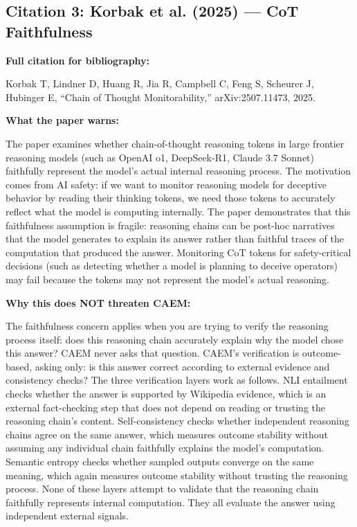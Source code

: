 \documentclass[11pt,a4paper]{article}
\newcommand{\citationbox}[2]{%
\begin{tcolorbox}[enhanced,breakable,
  colback=LightNavy,colframe=NavyBlue,boxrule=1.5pt,arc=4pt,
  left=8pt,right=8pt,top=6pt,bottom=6pt,
  title={\bfseries\small\color{white}#1},
  attach boxed title to top left={yshift=-2mm,xshift=6mm},
  boxed title style={colback=NavyBlue,arc=3pt,boxrule=0pt,
    left=4pt,right=4pt,top=2pt,bottom=2pt}]
#2
\end{tcolorbox}}
\begin{document}
\subsection{Citation 3: Korbak et al. (2025) — CoT Faithfulness}

\citationbox{CITATION 3: Korbak et al. (2025) on Reasoning Faithfulness}{
\textbf{Full citation for bibliography:}

Korbak T, Lindner D, Huang R, Jia R, Campbell C, Feng S, Scheurer J, Hubinger E, ``Chain of Thought Monitorability,'' arXiv:2507.11473, 2025.

\textbf{What the paper warns:}

The paper examines whether chain-of-thought reasoning tokens in large frontier reasoning models (such as OpenAI o1, DeepSeek-R1, Claude 3.7 Sonnet) faithfully represent the model's actual internal reasoning process. The motivation comes from AI safety: if we want to monitor reasoning models for deceptive behavior by reading their thinking tokens, we need those tokens to accurately reflect what the model is computing internally. The paper demonstrates that this faithfulness assumption is fragile: reasoning chains can be post-hoc narratives that the model generates to explain its answer rather than faithful traces of the computation that produced the answer. Monitoring CoT tokens for safety-critical decisions (such as detecting whether a model is planning to deceive operators) may fail because the tokens may not represent the model's actual reasoning.

\textbf{Why this does NOT threaten CAEM:}

The faithfulness concern applies when you are trying to verify the reasoning process itself: does this reasoning chain accurately explain why the model chose this answer? CAEM never asks that question. CAEM's verification is outcome-based, asking only: is this answer correct according to external evidence and consistency checks? The three verification layers work as follows. NLI entailment checks whether the answer is supported by Wikipedia evidence, which is an external fact-checking step that does not depend on reading or trusting the reasoning chain's content. Self-consistency checks whether independent reasoning chains agree on the same answer, which measures outcome stability without assuming any individual chain faithfully explains the model's computation. Semantic entropy checks whether sampled outputs converge on the same meaning, which again measures outcome stability without trusting the reasoning process. None of these layers attempt to validate that the reasoning chain faithfully represents internal computation. They all evaluate the answer using independent external signals.

}
\end{document}
